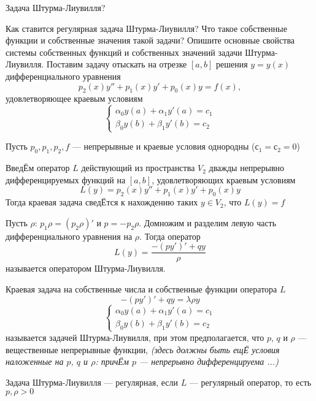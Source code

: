 \documentclass{article}
\begin{document}
\begin{section}{Задача Штурма-Лиувилля?}


\begin{subsection}{Как ставится регулярная задача Штурма-Лиувилля? Что такое собственные функции и собственные значения такой задачи? Опишите основные свойства системы собственных функций и собственных значений задачи Штурма-Лиувилля.}
Поставим задачу отыскать на отрезке $ [a, b] $ решения $ y = y(x)$ дифференциального уравнения 
\[ p_2(x)y'' + p_1(x)y' + p_0(x)y = f(x), \]
удовлетворяющее краевым условиям 
\[ \left\{\begin{matrix}
	\alpha_0 y(a) + \alpha_1 y'(a) = c_1\\ 
	\beta_0 y(b) + \beta_1 y'(b) = c_2
\end{matrix}\right. \]

Пусть $ p_0, p_1, p_2, f $ --- непрерывные и краевые условия однородны ($ с_1 = с_2 = 0 $)

ВведЁм оператор $ L $ действующий из пространства $V_2$ дважды непрерывно дифференцируемых функций на $ [a, b] $, удовлетворяющих краевым условиям 
\[ L(y) = p_2(x)y'' + p_1(x)y' + p_0(x)y \]
Тогда краевая задача сведЁтся к нахождению таких $ y \in V_2 $, что $ L(y) = f $

Пусть $ \rho $: $ p_1 \rho = (p_2 \rho)'$ и $p = -p_2 \rho$. Домножим и разделим левую часть дифференциального уравнения на $\rho$. Тогда оператор  
\[ L(y) = \frac{-(py')' + qy}{\rho} \]
называется оператором Штурма-Лиувилля. 

Краевая задача на собственные числа и собственные функции оператора $L$
\[ -(py')' + qy = \lambda \rho y \]
\[ \left\{\begin{matrix}
	\alpha_0 y(a) + \alpha_1 y'(a) = c_1\\ 
	\beta_0 y(b) + \beta_1 y'(b) = c_2
\end{matrix}\right. \]
называется задачей Штурма-Лиувилля, при этом предполагается, что $ p $, $ q $ и $ \rho $ --- вещественные непрерывные функции, \textit{(здесь должны быть ещЁ условия наложенные на $ p $, $ q $ и $ \rho $:  причЁм $ p $ --- непрерывно дифференцируема ...) }

Задача Штурма-Лиувилля --- регулярная, если $L$ --- регулярный оператор, то есть $p, \rho > 0$


\end{subsection}
\end{section}
\end{document}
